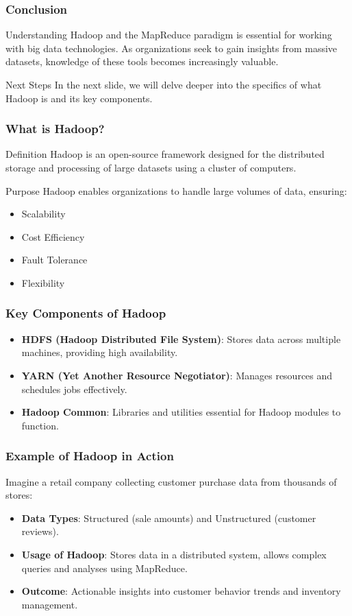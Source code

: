\documentclass[aspectratio=169]{beamer}
\begin{document}
\begin{frame}
    \frametitle{Conclusion}
    Understanding Hadoop and the MapReduce paradigm is essential for working with big data technologies. As organizations seek to gain insights from massive datasets, knowledge of these tools becomes increasingly valuable.
    
    \begin{block}{Next Steps}
        In the next slide, we will delve deeper into the specifics of what Hadoop is and its key components.
    \end{block}
\end{frame}

\begin{frame}[fragile]
    \frametitle{What is Hadoop?}
    \begin{block}{Definition}
        Hadoop is an open-source framework designed for the distributed storage and processing of large datasets using a cluster of computers.
    \end{block}
    \begin{block}{Purpose}
        Hadoop enables organizations to handle large volumes of data, ensuring:
        \begin{itemize}
            \item Scalability
            \item Cost Efficiency
            \item Fault Tolerance
            \item Flexibility
        \end{itemize}
    \end{block}
\end{frame}

\begin{frame}[fragile]
    \frametitle{Key Components of Hadoop}
    \begin{itemize}
        \item \textbf{HDFS (Hadoop Distributed File System)}: Stores data across multiple machines, providing high availability.
        \item \textbf{YARN (Yet Another Resource Negotiator)}: Manages resources and schedules jobs effectively.
        \item \textbf{Hadoop Common}: Libraries and utilities essential for Hadoop modules to function.
    \end{itemize}
\end{frame}

\begin{frame}[fragile]
    \frametitle{Example of Hadoop in Action}
    Imagine a retail company collecting customer purchase data from thousands of stores:
    \begin{itemize}
        \item \textbf{Data Types}: Structured (sale amounts) and Unstructured (customer reviews).
        \item \textbf{Usage of Hadoop}: Stores data in a distributed system, allows complex queries and analyses using MapReduce.
        \item \textbf{Outcome}: Actionable insights into customer behavior trends and inventory management.
    \end{itemize}
\end{frame}
\end{document}
